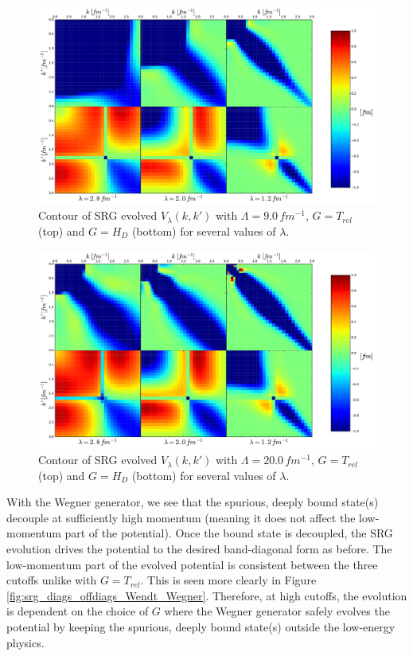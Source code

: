 \documentclass[preprintnumbers,floatfix,aps,prc,preprint]{revtex4-1}
\begin{document}
%
\begin{figure}[H]
  \centering
  \includegraphics[width=14cm]{srg_contours_Wendt_9}
   \hspace*{0.05\textwidth}%
  \caption{Contour of SRG evolved $V_{\lambda}(k,k')$ with $\Lambda=9.0\,fm^{-1}$, $G=T_{rel}$ (top) and $G=H_{D}$ (bottom) for several values of $\lambda$.}
  \label{fig:srg_contours_Wendt_9}
\end{figure}
%
\begin{figure}[H]
  \centering
  \includegraphics[width=14cm]{srg_contours_Wendt_20}
   \hspace*{0.05\textwidth}%
  \caption{Contour of SRG evolved $V_{\lambda}(k,k')$ with $\Lambda=20.0\,fm^{-1}$, $G=T_{rel}$ (top) and $G=H_{D}$ (bottom) for several values of $\lambda$.}
  \label{fig:srg_contours_Wendt_20}
\end{figure}
%
With the Wegner generator, we see that the spurious, deeply bound state(s) decouple at sufficiently high momentum (meaning it does not affect the low-momentum part of the potential). Once the bound state is decoupled, the SRG evolution drives the potential to the desired band-diagonal form as before. The low-momentum part of the evolved potential is consistent between the three cutoffs unlike with $G=T_{rel}$. This is seen more clearly in Figure \ref{fig:srg_diags_offdiags_Wendt_Wegner}. Therefore, at high cutoffs, the evolution is dependent on the choice of $G$ where the Wegner generator safely evolves the potential by keeping the spurious, deeply bound state(s) outside the low-energy physics. \\
\end{document}
